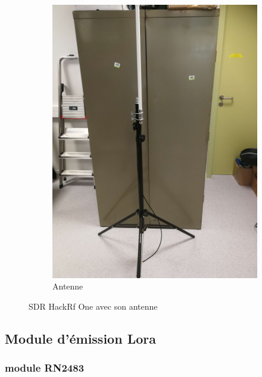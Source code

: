 \begin{figure}[h]
\begin{subfigure}{0.4\textwidth}
  \centering
  \includegraphics[width=\textwidth]{images/pied.png}
  \caption{Antenne}
  \label{term340}
\end{subfigure}
\caption{SDR HackRf One avec son antenne}
\label{fig:both_images}
\end{figure}

\newpage

\newpage

\subsection{Module d'émission Lora}

\subsubsection{module RN2483}

